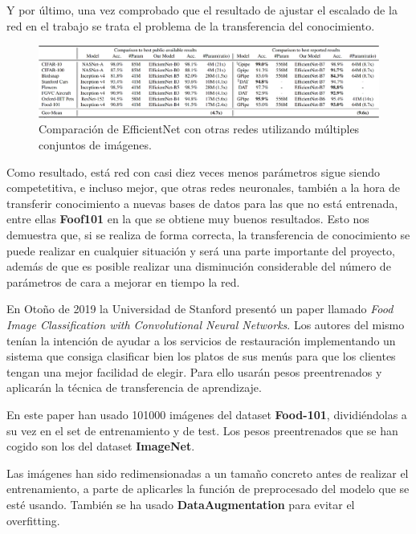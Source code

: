 Y por último, una vez comprobado que el resultado de ajustar el escalado de la red en el trabajo se trata el problema de la transferencia del conocimiento.

\begin{figure}[H]
  \centering
  \includegraphics[width=1\linewidth]{Imagenes/cmp-efficient.png}
  \caption{Comparación de EfficientNet con otras redes utilizando múltiples conjuntos de imágenes.}
  \label{fig:param-precision}
\end{figure}

Como resultado, está red con casi diez veces menos parámetros sigue siendo competetitiva, e incluso mejor, que otras redes neuronales, también a la hora de transferir conocimiento a nuevas bases de datos para las que no está entrenada, entre ellas \textbf{Foof101} en la que se obtiene muy buenos resultados. Esto nos demuestra que, si se realiza de forma correcta, la transferencia de conocimiento se puede realizar en cualquier situación y será una parte importante del proyecto, además de que es posible realizar una disminución considerable del número de parámetros de cara a mejorar en tiempo la red.


\newpage

En Otoño de 2019 la Universidad de Stanford presentó un paper llamado \textit{Food Image Classification with Convolutional Neural Networks}\cite{standford}. Los autores del mismo tenían la intención de ayudar a los servicios de restauración implementando un sistema que consiga clasificar bien los platos de sus menús para que los clientes tengan una mejor facilidad de elegir. Para ello usarán pesos preentrenados y aplicarán la técnica de transferencia de aprendizaje.

\vspace{3 mm}

En este paper han usado 101000 imágenes del dataset \textbf{Food-101}, dividiéndolas a su vez en el set de entrenamiento y de test. Los pesos preentrenados que se han cogido son los del dataset \textbf{ImageNet}.

\vspace{3 mm}

Las imágenes han sido redimensionadas a un tamaño concreto antes de realizar el entrenamiento, a parte de aplicarles la función de preprocesado del modelo que se esté usando. También se ha usado \textbf{DataAugmentation} para evitar el overfitting.

